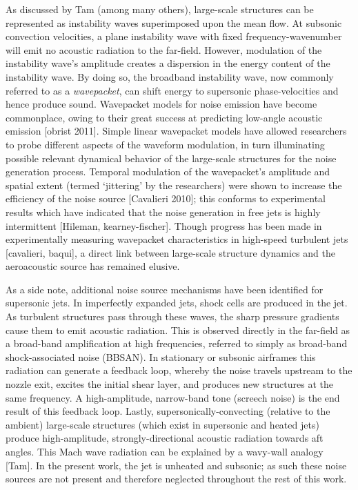 As discussed by Tam \etal [cite] (among many others), large-scale structures can be represented as instability waves superimposed upon the mean flow.
At subsonic convection velocities, a plane instability wave with fixed frequency-wavenumber will emit no acoustic radiation to the far-field.
However, modulation of the instability wave's amplitude creates a dispersion in the energy content of the instability wave.
By doing so, the broadband instability wave, now commonly referred to as a \emph{wavepacket}, can shift energy to supersonic phase-velocities and hence produce sound.
Wavepacket models for noise emission have become commonplace, owing to their great success at predicting low-angle acoustic emission [obrist 2011].
Simple linear wavepacket models have allowed researchers to probe different aspects of the waveform modulation, in turn illuminating possible relevant dynamical behavior of the large-scale structures for the noise generation process.
Temporal modulation of the wavepacket's amplitude and spatial extent (termed `jittering' by the researchers) were shown to increase the efficiency of the noise source [Cavalieri 2010]; this conforms to experimental results which have indicated that the noise generation in free jets is highly intermittent [Hileman, kearney-fischer]. 
Though progress has been made in experimentally measuring wavepacket characteristics in high-speed turbulent jets [cavalieri, baqui], a direct link between large-scale structure dynamics and the aeroacoustic source has remained elusive.
 
As a side note, additional noise source mechanisms have been identified for supersonic jets. In imperfectly expanded jets, shock cells are produced in the jet. As turbulent structures pass through these waves, the sharp pressure gradients cause them to emit acoustic radiation. 
This is observed directly in the far-field as a broad-band amplification at high frequencies, referred to simply as broad-band shock-associated noise (BBSAN). 
In stationary or subsonic airframes this radiation can generate a feedback loop, whereby the noise travels upstream to the nozzle exit, excites the initial shear layer, and produces new structures at the same frequency.
A high-amplitude, narrow-band tone (screech noise) is the end result of this feedback loop.
Lastly, supersonically-convecting (relative to the ambient) large-scale structures (which exist in supersonic and heated jets) produce high-amplitude, strongly-directional acoustic radiation towards aft angles.
This Mach wave radiation can be explained by a wavy-wall analogy [Tam].
In the present work, the jet is unheated and subsonic; as such these noise sources are not present and therefore neglected throughout the rest of this work.

 
